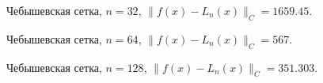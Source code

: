 \documentclass[12pt, a4paper]{article}
\begin{document}
\begin{figure}[h]
    \caption{Чебышевская сетка, $n = 32$, $ \| f(x) - L_n(x)  \|_C = 1659.45 $.}
\end{figure}

\pagebreak


\begin{figure}[h]
    \caption{Чебышевская сетка, $n = 64$, $ \| f(x) - L_n(x)  \|_C = 567 $.}
\end{figure}

\begin{figure}[h]
    \caption{Чебышевская сетка, $n = 128$, $ \| f(x) - L_n(x)  \|_C = 351.303 $.}
\end{figure}
\end{document}
